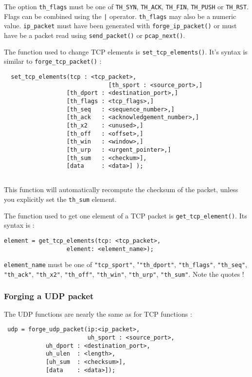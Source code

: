 \documentclass{article}
\begin{document}
The option \verb+th_flags+ must be one of \verb+TH_SYN+, \verb+TH_ACK+,
\verb+TH_FIN+, \verb+TH_PUSH+ or \verb+TH_RST+. Flags can be
combined using the \verb+|+ operator. \verb+th_flags+ may also
be a numeric value. \verb+ip_packet+ must have been generated with
\verb+forge_ip_packet()+ or must have be a packet read using
\verb+send_packet()+ or \verb+pcap_next()+.

The function used to change TCP elements is \verb+set_tcp_elements()+.
It's syntax is similar to \verb+forge_tcp_packet()+ :

\begin{verbatim}
  set_tcp_elements(tcp : <tcp_packet>,
                              [th_sport : <source_port>,]
			      [th_dport : <destination_port>,]
			      [th_flags : <tcp_flags>,]
			      [th_seq   : <sequence_number>,]
			      [th_ack   : <acknowledgement_number>,]
			      [th_x2    : <unused>,]
			      [th_off   : <offset>,]
			      [th_win   : <window>,]
			      [th_urp   : <urgent_pointer>,]
			      [th_sum   : <checkum>],
			      [data     : <data>] );
			      
\end{verbatim}
    
This function will automatically recompute the checksum of the packet, unless
you explicitly set the \verb+th_sum+ element.

The function used to get one element of a TCP packet is
\verb+get_tcp_element()+. Its syntax is :
\begin{verbatim}
element = get_tcp_elements(tcp: <tcp_packet>,
                  element: <element_name>);
\end{verbatim}

\verb+element_name+ must be one of \verb+"tcp_sport"+, "\verb+"th_dport"+,
\verb+"th_flags"+, \verb+"th_seq"+, \verb+"th_ack"+, \verb+"th_x2"+,
\verb+"th_off"+, \verb+"th_win"+, \verb+"th_urp"+, \verb+"th_sum"+. Note the
quotes !

\subsubsection{Forging a UDP packet}

The UDP functions are nearly the same as for TCP functions :
\begin{verbatim}
 udp = forge_udp_packet(ip:<ip_packet>,
                        uh_sport : <source_port>,
			uh_dport : <destination_port>,
			uh_ulen  : <length>,
			[uh_sum  : <checksum>],
			[data    : <data>]);
\end{verbatim}
\end{document}
